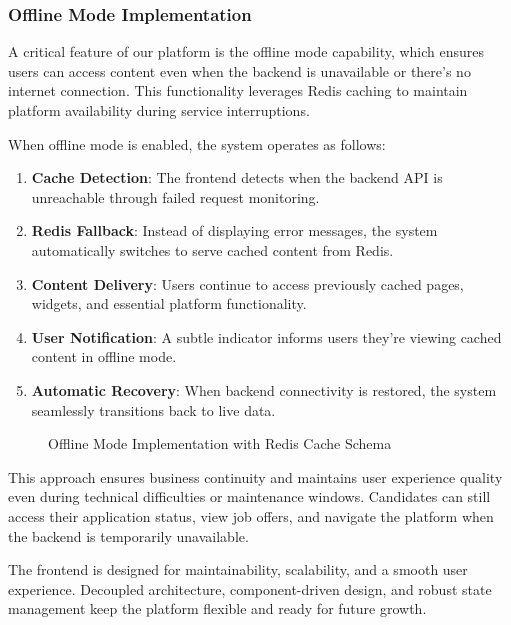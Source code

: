 \subsubsection{Offline Mode Implementation}
\noindent
A critical feature of our platform is the offline mode capability, which ensures users can access content even when the backend is unavailable or there's no internet connection. This functionality leverages Redis caching to maintain platform availability during service interruptions.

When offline mode is enabled, the system operates as follows:

\begin{enumerate}
    \item \textbf{Cache Detection}: The frontend detects when the backend API is unreachable through failed request monitoring.
    \item \textbf{Redis Fallback}: Instead of displaying error messages, the system automatically switches to serve cached content from Redis.
    \item \textbf{Content Delivery}: Users continue to access previously cached pages, widgets, and essential platform functionality.
    \item \textbf{User Notification}: A subtle indicator informs users they're viewing cached content in offline mode.
    \item \textbf{Automatic Recovery}: When backend connectivity is restored, the system seamlessly transitions back to live data.
\end{enumerate}

\begin{figure}[H]
    \centering
    \caption{Offline Mode Implementation with Redis Cache Schema}
    \label{fig:offline_mode_sequence}
\end{figure}

This approach ensures business continuity and maintains user experience quality even during technical difficulties or maintenance windows. Candidates can still access their application status, view job offers, and navigate the platform when the backend is temporarily unavailable.


The frontend is designed for maintainability, scalability, and a smooth user experience. Decoupled architecture, component-driven design, and robust state management keep the platform flexible and ready for future growth.
